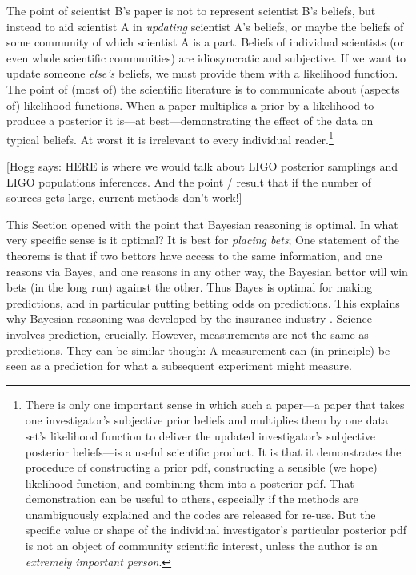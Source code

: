 \documentclass{article}
\newcommand{\sectionname}{Section}
\newcommand{\hogg}[1]{{\color{blue}[Hogg says: {#1}]}}
\begin{document}
The point of scientist B's paper is not to represent scientist B's beliefs, but instead to aid scientist A in \emph{updating} scientist A's beliefs, or maybe the beliefs of some community of which scientist A is a part.
Beliefs of individual scientists (or even whole scientific communities) are idiosyncratic and subjective.
If we want to update someone \emph{else's} beliefs, we must provide them with a likelihood function.
The point of (most of) the scientific literature is to communicate about (aspects of) likelihood functions.
When a paper multiplies a prior by a likelihood to produce a posterior it is---at best---demonstrating the effect of the data on typical beliefs.
At worst it is irrelevant to every individual reader.\footnote{%
There is only one important sense in which such a paper---a paper that takes one investigator's subjective prior beliefs and multiplies them by one data set's likelihood function to deliver the updated investigator's subjective posterior beliefs---is a useful scientific product.
It is that it demonstrates the procedure of constructing a prior pdf, constructing a sensible (we hope) likelihood function, and combining them into a posterior pdf.
That demonstration can be useful to others, especially if the methods are unambiguously explained and the codes are released for re-use.
But the specific value or shape of the individual investigator's particular posterior pdf is not an object of community scientific interest, unless the author is an \emph{extremely important person}.}

\hogg{HERE is where we would talk about LIGO posterior samplings and LIGO populations inferences.
And the point / result that if the number of sources gets large, current methods don't work!}

This \sectionname{} opened with the point that Bayesian reasoning is optimal.
In what very specific sense is it optimal?
It is best for \emph{placing bets};
One statement of the theorems is that if two bettors have access to the same information, and one reasons via Bayes, and one reasons in any other way, the Bayesian bettor will win bets (in the long run) against the other.
Thus Bayes is optimal for making predictions, and in particular putting betting odds on predictions.
This explains why Bayesian reasoning was developed by the insurance industry \cite{bayesactuary}.
Science involves prediction, crucially.
However, measurements are not the same as predictions.
They can be similar though: A measurement can (in principle) be seen as a prediction for what a subsequent experiment might measure.
\end{document}
